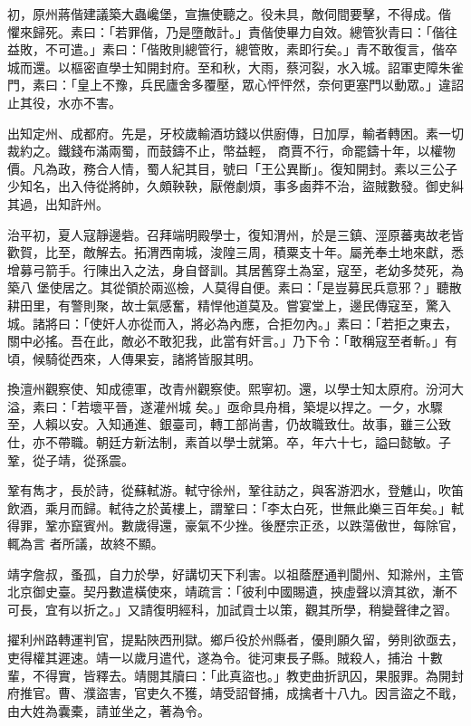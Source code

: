 \begin{pinyinscope}
 初，原州蔣偕建議築大蟲巉堡，宣撫使聽之。役未具，敵伺間要擊，不得成。偕
 懼來歸死。素曰：「若罪偕，乃是墮敵計。」責偕使畢力自效。總管狄青曰：「偕往益敗，不可遣。」素曰：「偕敗則總管行，總管敗，素即行矣。」青不敢復言，偕卒城而還。以樞密直學士知開封府。至和秋，大雨，蔡河裂，水入城。詔軍吏障朱雀門，素曰：「皇上不豫，兵民廬舍多覆壓，眾心怦怦然，奈何更塞門以動眾。」違詔止其役，水亦不害。



 出知定州、成都府。先是，牙校歲輸酒坊錢以供廚傳，日加厚，輸者轉困。素一切裁約之。鐵錢布滿兩蜀，而鼓鑄不止，幣益輕，
 商賈不行，命罷鑄十年，以權物價。凡為政，務合人情，蜀人紀其目，號曰「王公異斷」。復知開封。素以三公子少知名，出入侍從將帥，久頗鞅鞅，厭倦劇煩，事多鹵莽不治，盜賊數發。御史糾其過，出知許州。



 治平初，夏人寇靜邊砦。召拜端明殿學士，復知渭州，於是三鎮、涇原蕃夷故老皆歡賀，比至，敵解去。拓渭西南城，浚隍三周，積粟支十年。屬羌奉土地來獻，悉增募弓箭手。行陳出入之法，身自督訓。其居舊穿土為室，寇至，老幼多焚死，為築八
 堡使居之。其從領於兩巡檢，人莫得自便。素曰：「是豈募民兵意邪？」聽散耕田里，有警則聚，故士氣感奮，精悍他道莫及。嘗宴堂上，邊民傳寇至，驚入城。諸將曰：「使奸人亦從而入，將必為內應，合拒勿內。」素曰：「若拒之東去，關中必搖。吾在此，敵必不敢犯我，此當有奸言。」乃下令：「敢稱寇至者斬。」有頃，候騎從西來，人傳果妄，諸將皆服其明。



 換澶州觀察使、知成德軍，改青州觀察使。熙寧初。還，以學士知太原府。汾河大溢，素曰：「若壞平晉，遂灌州城
 矣。」亟命具舟楫，築堤以捍之。一夕，水驟至，人賴以安。入知通進、銀臺司，轉工部尚書，仍故職致仕。故事，雖三公致仕，亦不帶職。朝廷方新法制，素首以學士就第。卒，年六十七，謚曰懿敏。子鞏，從子靖，從孫震。



 鞏有雋才，長於詩，從蘇軾游。軾守徐州，鞏往訪之，與客游泗水，登魋山，吹笛飲酒，乘月而歸。軾待之於黃樓上，謂鞏曰：「李太白死，世無此樂三百年矣。」軾得罪，鞏亦竄賓州。數歲得還，豪氣不少挫。後歷宗正丞，以跌蕩傲世，每除官，輒為言
 者所議，故終不顯。



 靖字詹叔，蚤孤，自力於學，好講切天下利害。以祖蔭歷通判閬州、知滁州，主管北京御史臺。契丹數遣橫使來，靖疏言：「彼利中國賜遺，挾虛聲以濟其欲，漸不可長，宜有以折之。」又請復明經科，加試貢士以策，觀其所學，稍變聲律之習。



 擢利州路轉運判官，提點陜西刑獄。鄉戶役於州縣者，優則願久留，勞則欲亟去，吏得權其遲速。靖一以歲月遣代，遂為令。徙河東長子縣。賊殺人，捕治
 十數輩，不得實，皆釋去。靖閱其牘曰：「此真盜也。」教吏曲折訊囚，果服罪。為開封府推官。曹、濮盜害，官吏久不獲，靖受詔督捕，成擒者十八九。因言盜之不戢，由大姓為囊橐，請並坐之，著為令。




\end{pinyinscope}

